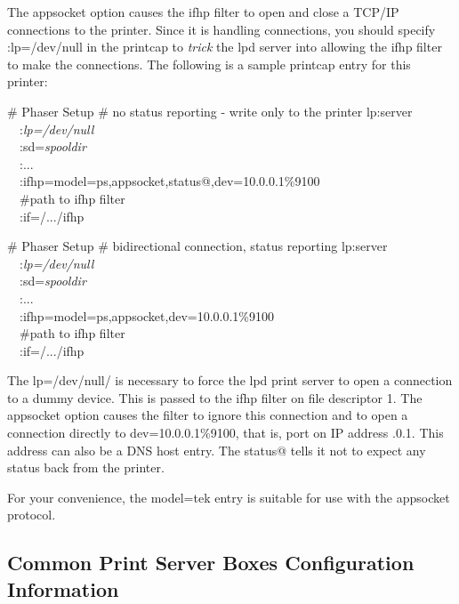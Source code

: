 \documentclass[a4paper]{article}
\begin{document}
The {\ttfamily appsocket} option causes the {\ttfamily ifhp} filter
to open and close a TCP/IP connections to the printer.
Since it is handling connections,
you should specify
{\ttfamily :lp=/dev/null}
in the printcap to {\itshape trick\/} the {\ttfamily lpd}
server into allowing the {\ttfamily ifhp} filter to make the connections.
The following is a sample printcap entry for this printer:
\begin{tscreen}
\# Phaser Setup
\#  no status reporting - write only to the printer
lp:server  \\ 
~~:{\itshape lp=/dev/null\/}  \\ 
~~:sd={\itshape spooldir\/}  \\ 
~~:...  \\ 
~~:ifhp=model=ps,appsocket,status@,dev=10.0.0.1\%9100\\ 
~~\#path to ifhp filter  \\ 
~~:if=/.../ifhp  \\ 
\end{tscreen}

\begin{tscreen}
\# Phaser Setup
\#  bidirectional connection, status reporting
lp:server  \\ 
~~:{\itshape lp=/dev/null\/}  \\ 
~~:sd={\itshape spooldir\/}  \\ 
~~:...  \\ 
~~:ifhp=model=ps,appsocket,dev=10.0.0.1\%9100\\ 
~~\#path to ifhp filter  \\ 
~~:if=/.../ifhp  \\ 
\end{tscreen}


The {\ttfamily lp=/dev/null/}
is necessary to force the {\ttfamily lpd} print server to open a connection
to a dummy device.
This is passed to the {\ttfamily ifhp} filter on file descriptor 1.
The {\ttfamily appsocket}
option causes the filter to ignore this connection
and to open a connection directly to {\ttfamily dev=10.0.0.1\%9100},
that is, port {} on IP address {.0.1}.
This address can also be a DNS host entry.
The {\ttfamily status@} tells it not to expect any status back from the printer.

For your convenience,
the {\ttfamily model=tek}
entry is suitable for use with the appsocket protocol.


\subsection{Common Print Server Boxes Configuration Information}
\end{document}
